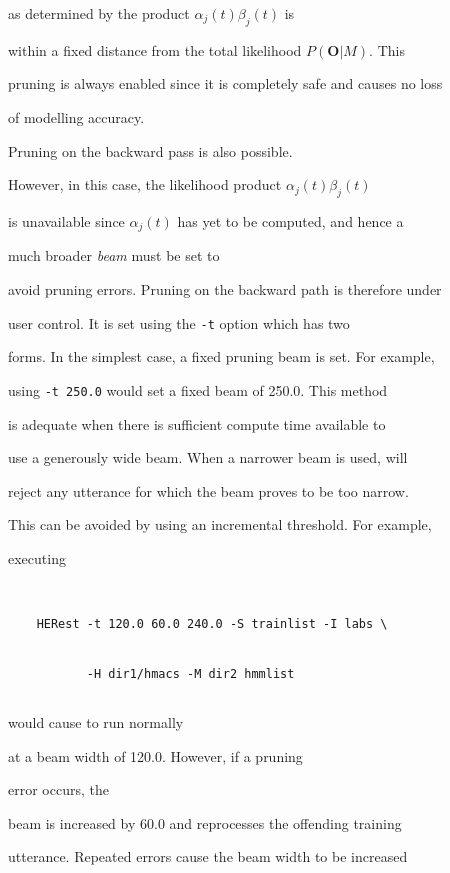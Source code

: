 as determined by the product $\alpha_j(t)\beta_j(t)$ is


within a fixed distance from the total likelihood $P(\bm{O}|M)$.  This


pruning is always enabled since it is completely safe and causes no loss


of modelling accuracy.  





Pruning on the backward pass is also possible.


However, in this case, the likelihood product $\alpha_j(t)\beta_j(t)$


is unavailable since $\alpha_j(t)$ has yet to be computed, and hence a 


much broader {\it beam} must be set to


avoid pruning errors.  Pruning on the backward path is therefore under


user control. It is set using the \texttt{-t} option which has two 


forms.  In the simplest case, a fixed pruning beam is set.  For example,


using \texttt{-t 250.0} would set a fixed beam of 250.0.  This method


is adequate when there is sufficient compute time available to 


use a generously wide beam.  When a narrower beam is used,  will 


reject any utterance for which the beam proves to be too narrow.


This can be avoided by using an incremental threshold.  For example,


executing 


\begin{verbatim}


    HERest -t 120.0 60.0 240.0 -S trainlist -I labs \


           -H dir1/hmacs -M dir2 hmmlist


\end{verbatim}


would cause  to run normally


at a beam width of 120.0.  However, if a pruning 


error occurs, the


beam is increased by 60.0 and  reprocesses the offending training


utterance.  Repeated errors cause the beam width to be increased


